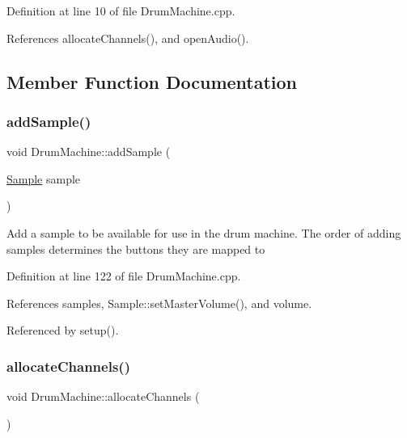 Definition at line 10 of file Drum\+Machine.\+cpp.



References allocate\+Channels(), and open\+Audio().



\subsection{Member Function Documentation}
\mbox{\label{class_drum_machine_a530ac2c3529492c62a01619786fb3765}} 
\subsubsection{\texorpdfstring{add\+Sample()}{addSample()}}
{\footnotesize\ttfamily void Drum\+Machine\+::add\+Sample (\begin{DoxyParamCaption}\item[{\hyperlink{class_sample}{Sample}}]{sample }\end{DoxyParamCaption})}

Add a sample to be available for use in the drum machine. The order of adding samples determines the buttons they are mapped to 

Definition at line 122 of file Drum\+Machine.\+cpp.



References samples, Sample\+::set\+Master\+Volume(), and volume.



Referenced by setup().

\mbox{\label{class_drum_machine_a5a42497c3a1f390537b6c12fddab1619}} 
\subsubsection{\texorpdfstring{allocate\+Channels()}{allocateChannels()}}
{\footnotesize\ttfamily void Drum\+Machine\+::allocate\+Channels (\begin{DoxyParamCaption}{ }\end{DoxyParamCaption})\hspace{0.3cm}{\ttfamily [private]}}



